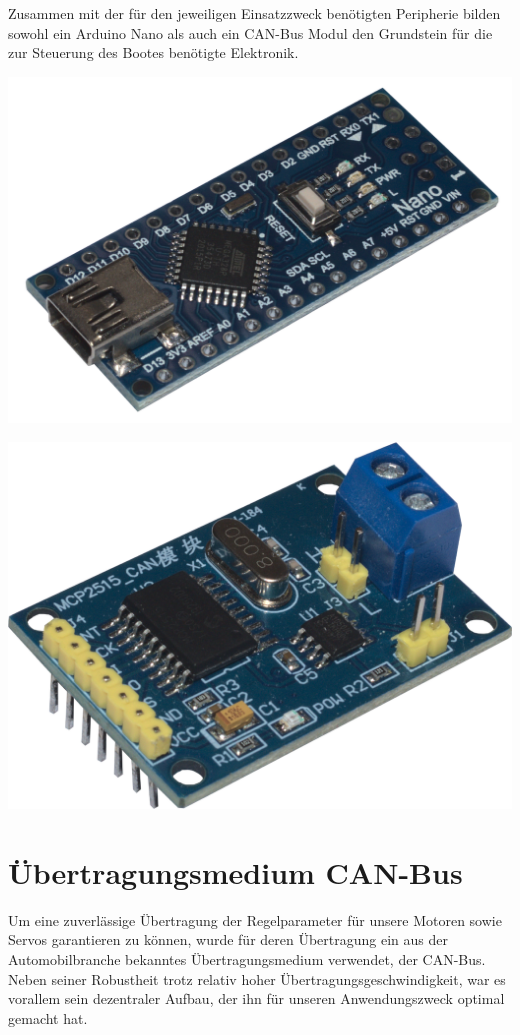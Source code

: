 Zusammen mit der für den jeweiligen Einsatzzweck benötigten Peripherie bilden sowohl ein Arduino Nano als auch ein CAN-Bus Modul den Grundstein für die zur Steuerung des Bootes benötigte Elektronik.\\

\begin{minipage}{7cm}
    \includegraphics[width=\textwidth]{Fotos/Arduino_Nano.png}
\end{minipage}
\begin{minipage}{7cm}
\includegraphics[width=\textwidth]{Fotos/CAN_BUS_Shield.png}
\end{minipage}
\section{Übertragungsmedium CAN-Bus}
Um eine zuverlässige Übertragung der Regelparameter für unsere Motoren sowie Servos garantieren zu können, wurde für deren Übertragung ein aus der Automobilbranche bekanntes Übertragungsmedium verwendet, der CAN-Bus. 
Neben seiner Robustheit trotz relativ hoher Übertragungsgeschwindigkeit, war es vorallem sein dezentraler Aufbau, der ihn für unseren Anwendungszweck optimal gemacht hat.
\newpage
